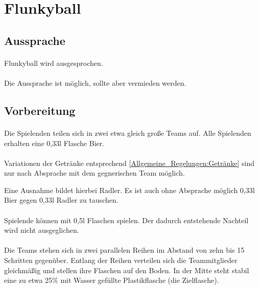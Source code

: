 \section{Flunkyball}
\subsection{Aussprache}
\paragraph{}
Flunkyball wird  ausgesprochen.

\paragraph{}
Die Aussprache  ist möglich, sollte aber vermieden werden.

\subsection{Vorbereitung}
\paragraph{}
Die Spielenden teilen sich in zwei etwa gleich große Teams auf.
Alle Spielenden erhalten eine 0,33l Flasche Bier.

\paragraph{}Variationen der Getränke entsprechend \ref{Allgemeine_Regelungen:Getränke} sind nur nach Absprache mit dem gegnerischen Team möglich.

Eine Ausnahme bildet hierbei Radler.
Es ist auch ohne Absprache möglich 0,33l Bier gegen 0,33l Radler zu tauschen.

\paragraph{}
Spielende können mit 0,5l Flaschen spielen. Der dadurch entstehende Nachteil wird nicht ausgeglichen.

\paragraph{}
Die Teams stehen sich in zwei parallelen Reihen im Abstand von zehn bis 15 Schritten gegenüber.
Entlang der Reihen verteilen sich die Teammitglieder gleichmäßig und stellen ihre Flaschen auf den Boden.
In der Mitte steht stabil eine zu etwa 25\% mit Wasser gefüllte Plastikflasche (die Zielflasche).


